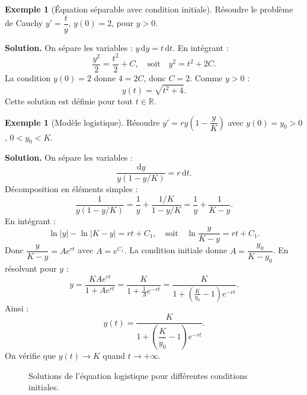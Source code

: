 \documentclass[12pt,a4paper,openany]{book}
\theoremstyle{definition}
\newtheorem{exemple}[definition]{Exemple}
\theoremstyle{plain}
\theoremstyle{remark}
\newcommand{\R}{\mathbb{R}}
\newcommand{\dd}{\mathrm{d}}
\newcommand{\abs}[1]{\left|#1\right|}
\begin{document}
\begin{exemple}[Équation séparable avec condition initiale]
\label{ex:separable-2}
Résoudre le problème de Cauchy $y' = \dfrac{t}{y}$, $y(0) = 2$, pour $y > 0$.

\textbf{Solution.} On sépare les variables : $y\,\dd y = t\,\dd t$. En intégrant :
\[
\frac{y^2}{2} = \frac{t^2}{2} + C, \quad \text{soit} \quad y^2 = t^2 + 2C.
\]
La condition $y(0) = 2$ donne $4 = 2C$, donc $C = 2$. Comme $y > 0$ :
\[
\boxed{y(t) = \sqrt{t^2 + 4}.}
\]
Cette solution est définie pour tout $t \in \R$.
\end{exemple}

\begin{exemple}[Modèle logistique]
\label{ex:logistique-resolution}
Résoudre $y' = ry\!\left(1 - \dfrac{y}{K}\right)$ avec $y(0) = y_0 > 0$, $0 < y_0 < K$.

\textbf{Solution.} On sépare les variables :
\[
\frac{\dd y}{y(1 - y/K)} = r\,\dd t.
\]
Décomposition en éléments simples :
\[
\frac{1}{y(1 - y/K)} = \frac{1}{y} + \frac{1/K}{1 - y/K} = \frac{1}{y} + \frac{1}{K - y}.
\]
En intégrant :
\[
\ln\abs{y} - \ln\abs{K - y} = rt + C_1, \quad \text{soit} \quad \ln\frac{y}{K - y} = rt + C_1.
\]
Donc $\dfrac{y}{K - y} = Ae^{rt}$ avec $A = e^{C_1}$. La condition initiale donne $A = \dfrac{y_0}{K - y_0}$. En résolvant pour $y$ :
\[
y = \frac{KAe^{rt}}{1 + Ae^{rt}} = \frac{K}{1 + \frac{1}{A}e^{-rt}} = \frac{K}{1 + \left(\frac{K}{y_0} - 1\right)e^{-rt}}.
\]
Ainsi :
\[
\boxed{y(t) = \frac{K}{1 + \left(\dfrac{K}{y_0} - 1\right)e^{-rt}}.}
\]
On vérifie que $y(t) \to K$ quand $t \to +\infty$.
\end{exemple}

\begin{figure}[ht]
\centering
{}
\caption{Solutions de l'équation logistique pour différentes conditions initiales.}
\label{fig:logistique}
\end{figure}
\end{document}
